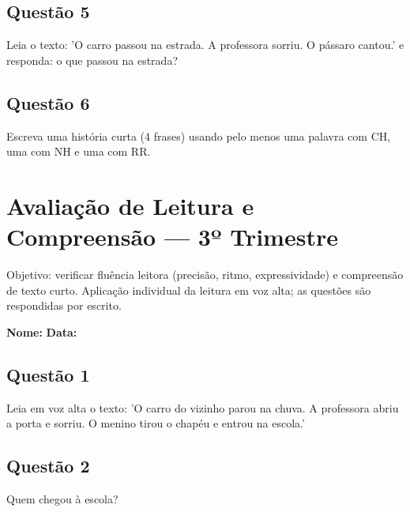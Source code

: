 \subsection*{Questão 5}
Leia o texto: 'O carro passou na estrada. A professora sorriu. O pássaro cantou.' e responda: o que passou na estrada?

\begin{center}
  \underline{\hspace{12cm}}
\end{center}

\subsection*{Questão 6}
Escreva uma história curta (4 frases) usando pelo menos uma palavra com CH, uma com NH e uma com RR.

\begin{center}
  \underline{\hspace{12cm}}
\end{center}

\clearpage

\section{Avaliação de Leitura e Compreensão — 3º Trimestre}

\begin{avaliacao}
Objetivo: verificar fluência leitora (precisão, ritmo, expressividade) e compreensão de texto curto. Aplicação individual da leitura em voz alta; as questões são respondidas por escrito.
\end{avaliacao}

\noindent\textbf{Nome:} \underline{\hspace{4cm}} \quad \textbf{Data:} \underline{\hspace{2cm}}

\subsection*{Questão 1}
Leia em voz alta o texto: 'O carro do vizinho parou na chuva. A professora abriu a porta e sorriu. O menino tirou o chapéu e entrou na escola.'

\begin{center}
  \underline{\hspace{12cm}}
\end{center}

\subsection*{Questão 2}
Quem chegou à escola?

